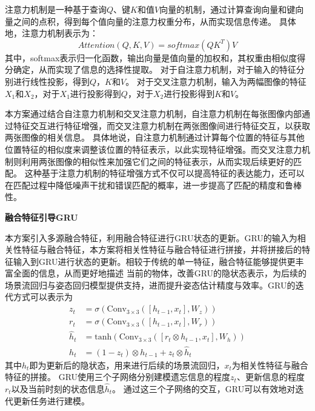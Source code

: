 \documentclass[12pt]{article}
\begin{document}
注意力机制是一种基于查询$Q$、键$K$和值$V$向量的机制，通过计算查询向量和键向量之间的点积，得到每个值向量的注意力权重分布，从而实现信息传递。
具体地，注意力机制表示为：
\begin{equation}
    Attention(Q, K, V) = softmax(QK^T)V
\end{equation}
其中，softmax表示归一化函数，输出向量是值向量的加权和，其权重由相似度得分确定，从而实现了信息的选择性提取。
对于自注意力机制，对于输入的特征分别进行线性投影，得到$Q$，$K$和$V$。
对于交叉注意力机制，输入为两幅图像的特征$X_1$和$X_2$，对于$X_1$进行投影得到$Q$，对于$X_2$进行投影得到$K$和$V$。

本方案通过结合自注意力机制和交叉注意力机制，自注意力机制在每张图像内部通过特征交互进行特征增强，而交叉注意力机制在两张图像间进行特征交互，以获取两张图像的相关信息。
具体地说，自注意力机制通过计算每个位置的特征与其他位置特征的相似度来调整该位置的特征表示，以此实现特征增强。而交叉注意力机制则利用两张图像的相似性来加强它们之间的特征表示，从而实现后续更好的匹配。
这种基于注意力机制的特征增强方式不仅可以提高特征的表达能力，还可以在匹配过程中降低噪声干扰和错误匹配的概率，进一步提高了匹配的精度和鲁棒性。





\textbf{融合特征引导GRU}

本方案引入多源融合特征，利用融合特征进行GRU状态的更新。GRU的输入为相关性特征与融合特征，本方案将相关性特征与融合特征进行拼接，并将拼接后的特征输入到GRU进行状态的更新。相较于传统的单一特征，融合特征能够提供更丰富全面的信息，从而更好地描述
当前的物体，改善GRU的隐状态表示，为后续的场景流回归与姿态回归模型提供支持，进而提升姿态估计精度与效率。GRU的迭代方式可以表示为
\begin{equation}
    \begin{aligned}
        z_t &= \sigma(\mathrm{Conv}_{3\times3}([h_{t-1}, x_t], W_z)) \\
        r_t &= \sigma(\mathrm{Conv}_{3\times3}([h_{t-1}, x_t], W_r)) \\
        \hat{h}_t &= \mathrm{tanh}(\mathrm{Conv}_{3\times3}([r_t \otimes h_{t-1}, x_t], W_h)) \\
        h_t &= (1 - z_t)\otimes h_{t-1} + z_t \otimes \hat{h}_t
    \end{aligned}
\end{equation}
其中$h_t$即为更新后的隐状态，用来进行后续的场景流回归，$x_t$为相关性特征与融合特征的拼接。
GRU使用三个子网络分别建模遗忘信息的程度$z_t$、更新信息的程度$r_t$以及当前时刻的状态信息$\hat{h}_t$。
通过这三个子网络的交互，GRU可以有效地对迭代更新任务进行建模。
\end{document}
